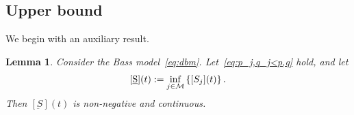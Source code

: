 \documentclass[review]{elsarticle}
\newtheorem{lemma}{Lemma}
\begin{document}
	
\subsection{Upper bound}
 \label{sec:upper}
 


 
 
We begin with an auxiliary result.
\begin{lemma}
	\label{cor:lipschitz}
	Consider the  Bass model~\eqref{eq:dbm}.
	Let~\eqref{eq:p_j,q_j<p,q} hold, and let
	\begin{equation}
	\label{eq:s_inf_s_j}
		[\underbar{S}](t) :=  \inf_{j\in {\cal M}} \left\{[S_j](t) \right\}.
	\end{equation}
	Then $[\underbar{S}](t)$ is non-negative and continuous.
\end{lemma}
\end{document}
